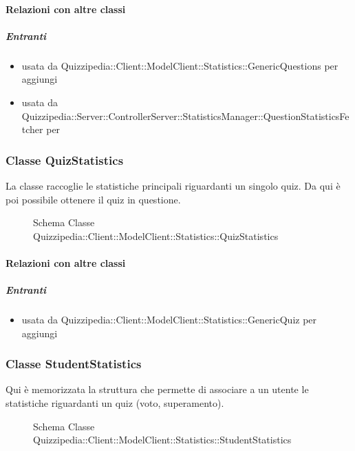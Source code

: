 \paragraph{Relazioni con altre classi}
\subparagraph{Entranti}
\begin{itemize}
\item usata da Quizzipedia::Client::ModelClient::Statistics::GenericQuestions per aggiungi
\item usata da Quizzipedia::Server::ControllerServer::StatisticsManager::QuestionStatisticsFetcher per 
\end{itemize}
\subsubsection{Classe QuizStatistics}
La classe raccoglie le statistiche principali riguardanti un singolo quiz. Da qui è poi possibile ottenere il quiz in questione.
\begin{figure}[H]
\centering
\noindent{}
\caption[Schema Classe QuizStatistics]{Schema Classe Quizzipedia::Client::ModelClient::Statistics::QuizStatistics}
\end{figure}
\paragraph{Relazioni con altre classi}
\subparagraph{Entranti}
\begin{itemize}
\item usata da Quizzipedia::Client::ModelClient::Statistics::GenericQuiz per aggiungi
\end{itemize}
\subsubsection{Classe StudentStatistics}
Qui è memorizzata la struttura che permette di associare a un utente le statistiche riguardanti un quiz (voto, superamento).
\begin{figure}[H]
\centering
\noindent{}
\caption[Schema Classe StudentStatistics]{Schema Classe Quizzipedia::Client::ModelClient::Statistics::StudentStatistics}
\end{figure}
